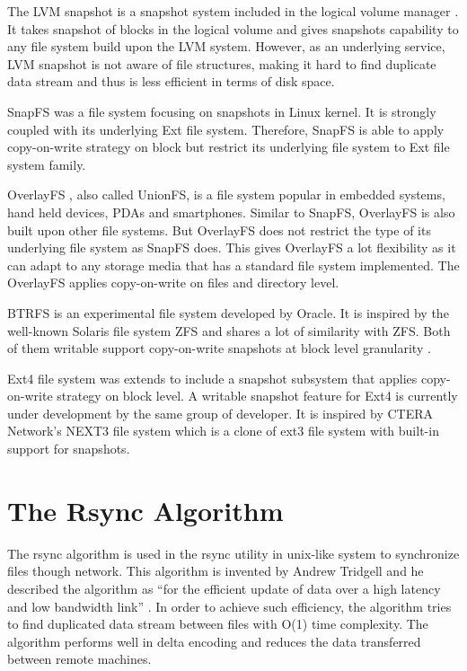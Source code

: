     The LVM snapshot is a snapshot system included in the logical volume manager \cite{lvm}\cite{disk_perform_lvm}. It takes snapshot of blocks in the logical volume and gives snapshots capability to any file system build upon the LVM system. However, as an underlying service, LVM snapshot is not aware of file structures, making it hard to find duplicate data stream and thus is less efficient in terms of disk space.
    
    SnapFS was a file system focusing on snapshots in Linux kernel. \cite{snapfs} It is strongly coupled with its underlying Ext file system. Therefore, SnapFS is able to apply copy-on-write strategy on block but restrict its underlying file system to Ext file system family. 
    
    OverlayFS \cite{overlayfs}, also called UnionFS, is a file system popular in embedded systems, hand held devices, PDAs and smartphones. Similar to SnapFS, OverlayFS is also built upon other file systems. But OverlayFS does not restrict the type of its underlying file system as SnapFS does. This gives OverlayFS a lot flexibility as it can adapt to any storage media that has a standard file system implemented. The OverlayFS applies copy-on-write on files and directory level.

    BTRFS \cite{btrfs} is an experimental file system developed by Oracle. It is inspired by the well-known Solaris file system ZFS and shares a lot of similarity with ZFS. Both of them writable support copy-on-write snapshots at block level granularity \cite{btrfscow}.
    
    Ext4 file system was extends to include a snapshot subsystem that applies copy-on-write strategy on block level. A writable snapshot feature for Ext4 is currently under development by the same group of developer.\cite{ext4snap} It is inspired by CTERA Network's NEXT3 file system which is a clone of ext3 file system with built-in support for snapshots.

\section{The Rsync Algorithm}
    
    The rsync algorithm is used in the rsync utility in unix-like system to synchronize files though network. This algorithm is invented by Andrew Tridgell and he described the algorithm as ``for the efficient update of data over a high latency and low bandwidth link'' \cite{rsync_alg}. In order to achieve such efficiency, the algorithm tries to find duplicated data stream between files with O(1) time complexity. The algorithm performs well in delta encoding and reduces the data transferred between remote machines.

